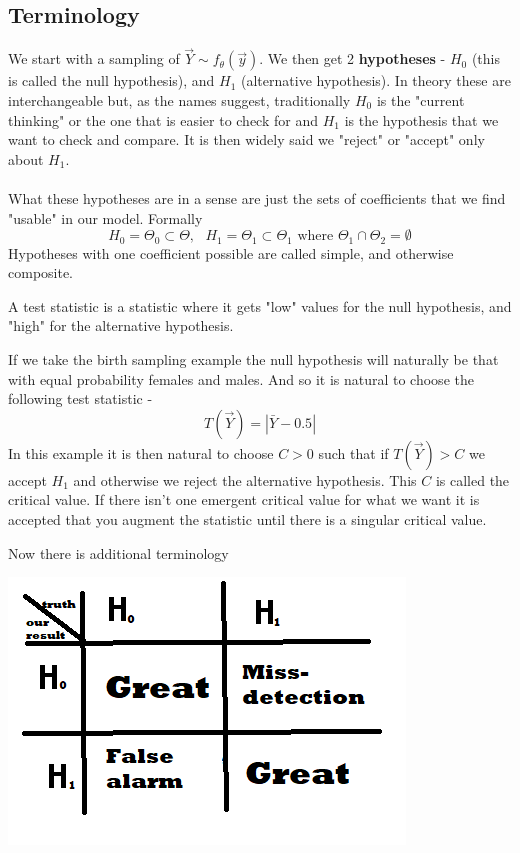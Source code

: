 \documentclass[../main.tex]{subfiles}
\begin{document}
\subsection{Terminology}
We start with a sampling of $\overrightarrow{Y}\sim f_{\theta}(\overrightarrow{y})$. We then get 2 \textbf{hypotheses} - $H_0$ (this is called the null hypothesis), and $H_1$ (alternative hypothesis). In theory these are interchangeable but, as the names suggest, traditionally $H_0$ is the "current thinking" or the one that is easier to check for and $H_1$ is the hypothesis that we want to check and compare. It is then widely said we "reject" or "accept" only about $H_1$. \\\\
What these hypotheses are in a sense are just the sets of coefficients that we find "usable" in our model. Formally
\[H_0 = \Theta_0\subset \Theta, \text{ } H_1 = \Theta_1\subset\Theta_1\text{ where } \Theta_1\cap\Theta_2=\emptyset\]
Hypotheses with one coefficient possible are called simple, and otherwise composite. 
\begin{definition}
A test statistic is a statistic where it gets "low" values for the null hypothesis, and "high" for the alternative hypothesis. 
\end{definition}
\begin{example}
If we take the birth sampling example the null hypothesis will naturally be that with equal probability females and males. And so it is natural to choose the following test statistic - 
\[T(\overrightarrow{Y}) = |\bar{Y}-0.5|\]
In this example it is then natural to choose $C>0$ such that if $T(\overrightarrow{Y})>C$ we accept $H_1$ and otherwise we reject the alternative hypothesis. This $C$ is called the critical value. If there isn't one emergent critical value for what we want it is accepted that you augment the statistic until there is a singular critical value.  
\end{example}
Now there is additional terminology
\begin{center}
    \includegraphics{images/Table For Stat Thoery.png}
\end{center}
\end{document}
